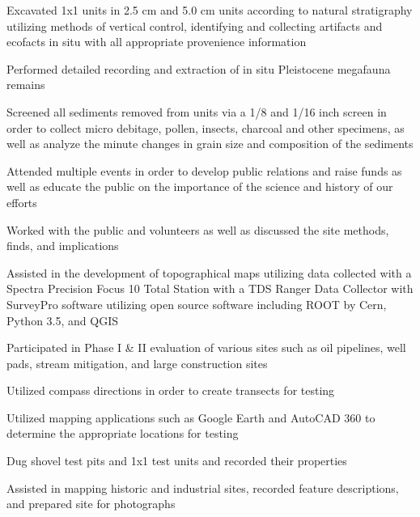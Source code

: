 \documentclass[letterpaper]{resume}
\begin{document}
\begin{compactitem}
\item Excavated 1x1 units in 2.5 cm and 5.0 cm units according to natural stratigraphy utilizing methods of vertical control, identifying and collecting artifacts and ecofacts in situ with all appropriate provenience information
\item Performed detailed recording and extraction of in situ Pleistocene megafauna remains
\item Screened all sediments removed from units via a 1/8 and 1/16 inch screen in order to collect micro debitage, pollen, insects, charcoal and other specimens, as well as analyze the minute changes in grain size and composition of the sediments
\item Attended multiple events in order to develop public relations and raise funds as well as educate the public on the importance of the science and history of our efforts
\item Worked with the public and volunteers as well as discussed the site methods, finds, and implications
\item Assisted in the development of topographical maps utilizing data collected with a Spectra Precision Focus 10 Total Station with a TDS Ranger Data Collector with SurveyPro software utilizing open source software including ROOT by Cern, Python 3.5, and QGIS
\end{compactitem}

\begin{compactitem}
\item Participated in Phase I \& II evaluation of various sites such as oil pipelines, well pads, stream mitigation, and large construction sites
\item Utilized compass directions in order to create transects for testing
\item Utilized mapping applications such as Google Earth and AutoCAD 360 to determine the appropriate locations for testing
\item Dug shovel test pits and 1x1 test units and recorded their properties
\item Assisted in mapping historic and industrial sites, recorded feature descriptions, and prepared site for photographs
\end{compactitem}
\end{document}
